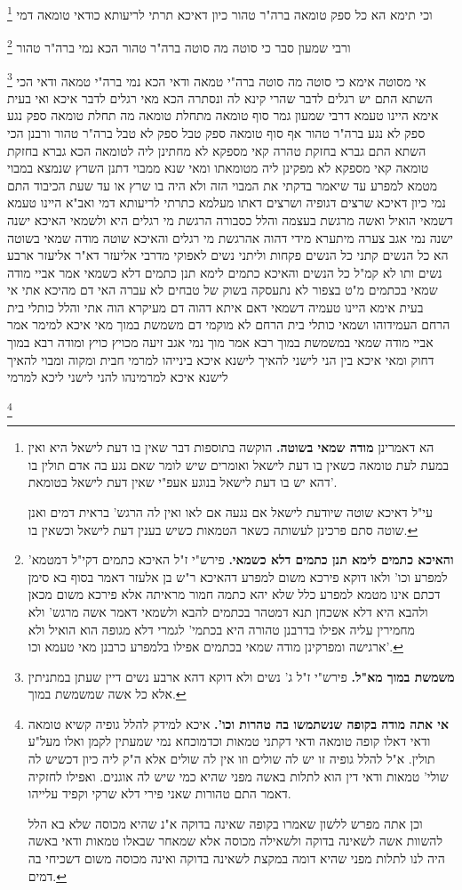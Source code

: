 \documentclass[12pt, openany]{book}
\newcommand{\footnotecomment}[1]{
	\renewcommand\thefootnote{}
	\footnote{#1}}
\newcommand{\commenta}[1]{\footnotecomment{#1}}
\begin{document}
{\commenta{ הא דאמרינן \textbf{מודה שמאי בשוטה.} הוקשה בתוספות דבר שאין בו דעת לישאל היא ואין במעת לעת טומאה כשאין בו דעת לישאל ואומרים שיש לומר שאם נגע בה אדם תולין בו דהא יש בו דעת לישאל בנוגע אעפ"י שאין דעת לישאל בטומאת'.\par עי"ל דאיכא שוטה שיודעת לישאל אם נגעה אם לאו ואין לה הרגש' בראית דמים ואנן שוטה סתם פרכינן לעשותה כשאר הטמאות כשיש בענין דעת לישאל וכשאין בו. }
וכי תימא הא כל ספק טומאה ברה"ר טהור כיון דאיכא תרתי לריעותא כודאי טומאה דמי 
\commenta{\textbf{והאיכא כתמים לימא תנן כתמים דלא כשמאי.} פירש"י ז"ל האיכא כתמים דקי"ל דמטמא' למפרע וכו' ולאו דוקא פירכא משום למפרע דהאיכא ר"ש בן אלעזר דאמר בסוף בא סימן דכתם אינו מטמא למפרע כלל שלא יהא כתמה חמור מראיתה אלא פירכא משום מכאן ולהבא היא דלא אשכחן תנא דמטהר בכתמים להבא ולשמאי דאמר אשה מרגש' ולא מחמירין עליה אפילו בדרבנן טהורה היא בכתמי' לגמרי דלא מגופה הוא הואיל ולא ארגישה ומפרקינן מודה שמאי בכתמים אפילו בלמפרע כרבנן מאי טעמא וכו'. }
ורבי שמעון סבר כי סוטה מה סוטה ברה"ר טהור הכא נמי ברה"ר טהור 
\commenta{\textbf{משמשת במוך מא"ל.} פירש"י ז"ל ג' נשים ולא דוקא דהא ארבע נשים דיין שעתן במתניתין אלא כל אשה שמשמשת במוך. }
אי מסוטה אימא כי סוטה מה סוטה ברה"י טמאה ודאי הכא נמי ברה"י טמאה ודאי
הכי השתא התם יש רגלים לדבר שהרי קינא לה ונסתרה הכא מאי רגלים לדבר איכא 
ואי בעית אימא היינו טעמא דרבי שמעון גמר סוף טומאה מתחלת טומאה 
מה תחלת טומאה ספק נגע ספק לא נגע ברה"ר טהור אף סוף טומאה ספק טבל ספק לא טבל ברה"ר טהור 
ורבנן הכי השתא התם גברא בחזקת טהרה קאי מספקא לא מחתינן ליה לטומאה הכא גברא בחזקת טומאה קאי מספקא לא מפקינן ליה מטומאתו 
ומאי שנא ממבוי דתנן השרץ שנמצא במבוי מטמא למפרע עד שיאמר בדקתי את המבוי הזה ולא היה בו שרץ או עד שעת הכיבוד 
התם נמי כיון דאיכא שרצים דגופיה ושרצים דאתו מעלמא כתרתי לריעותא דמי 
ואב"א היינו טעמא דשמאי הואיל ואשה מרגשת בעצמה והלל כסבורה הרגשת מי רגלים היא 
ולשמאי האיכא ישנה ישנה נמי אגב צערה מיתערא מידי דהוה אהרגשת מי רגלים 
והאיכא שוטה מודה שמאי בשוטה הא כל הנשים קתני כל הנשים פקחות 
וליתני נשים לאפוקי מדרבי אליעזר דא"ר אליעזר ארבע נשים ותו לא קמ"ל כל הנשים 
והאיכא כתמים לימא תנן כתמים דלא כשמאי אמר אביי מודה שמאי בכתמים מ"ט בצפור לא נתעסקה בשוק של טבחים לא עברה האי דם מהיכא אתי 
אי בעית אימא היינו טעמיה דשמאי דאם איתא דהוה דם מעיקרא הוה אתי והלל כותלי בית הרחם העמידוהו ושמאי כותלי בית הרחם לא מוקמי דם 
משמשת במוך מאי איכא למימר אמר אביי מודה שמאי במשמשת במוך 
רבא אמר מוך נמי אגב זיעה מכויץ כויץ ומודה רבא במוך דחוק 
ומאי איכא בין הני לישני להאיך לישנא
איכא בינייהו למרמי חבית ומקוה ומבוי להאיך לישנא איכא למרמינהו להני לישני ליכא למרמי 
\commenta{\textbf{אי אתה מודה בקופה שנשתמשו בה טהרות וכו'.} איכא למידק להלל גופיה קשיא טומאה ודאי דאלו קופה טומאה ודאי דקתני טמאות וכדמוכחא נמי שמעתין לקמן ואלו מעל"ע תולין. א"ל להלל גופיה זו יש לה שולים וזו אין לה שולים אלא ה"ק ליה כיון דכשיש לה שולי' טמאות ודאי דין הוא לתלות באשה מפני שהיא כמי שיש לה אוגנים. ואפילו לחזקיה דאמר התם טהורות שאני פירי דלא שרקי וקפיד עלייהו.\par וכן אתה מפרש ללשון שאמרו בקופה שאינה בדוקה א"נ שהיא מכוסה שלא בא הלל להשוות אשה לשאינה בדוקה ולשאילה מכוסה אלא שמאחר שבאלו טמאות ודאי באשה היה לנו לתלות מפני שהיא דומה במקצת לשאינה בדוקה ואינה מכוסה משום דשכיחי בה דמים. }
}
\end{document}

